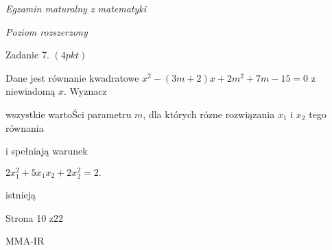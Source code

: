 \documentclass[a4paper,12pt]{article}
\begin{document}
{\it Egzamin maturalny z matematyki}

{\it Poziom rozszerzony}

Zadanie 7. $(4pkt)$

Dane jest równanie kwadratowe $x^{2}-(3m+2)x+2m^{2}+7m-15=0$ z niewiadomą $x$. Wyznacz

wszystkie wartoŚci parametru $m$, dla których rózne rozwiązania $x_{1}$ i $x_{2}$ tego równania

i spełniają warunek

$2x_{1}^{2}+5x_{1}x_{2}+2x_{2}^{2}=2.$

istnieją

Strona 10 z22

MMA-IR
\end{document}
